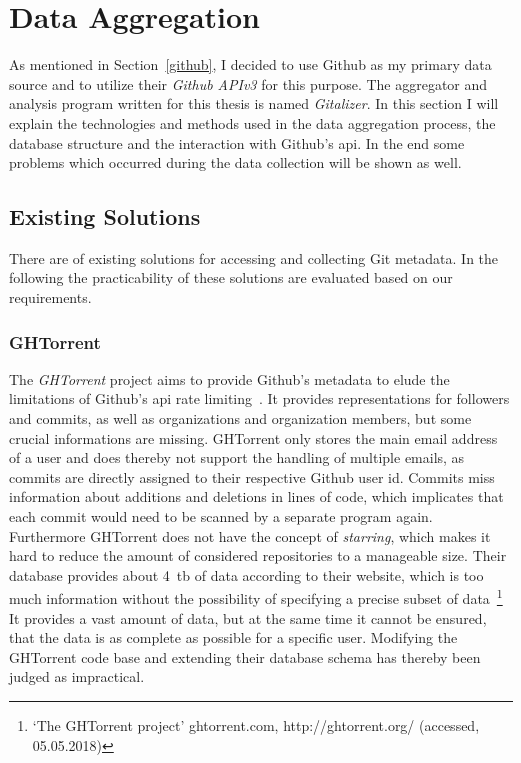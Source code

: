 \section{Data Aggregation}\label{aggregator}
As mentioned in Section~\ref{github}, I decided to use Github as my primary data source and to utilize their \emph{Github APIv3} for this purpose.
The aggregator and analysis program written for this thesis is named \emph{Gitalizer}.
In this section I will explain the technologies and methods used in the data aggregation process, the database structure and the interaction with Github's \ac{api}.
In the end some problems which occurred during the data collection will be shown as well.


\subsection{Existing Solutions}
There are of existing solutions for accessing and collecting Git metadata.
In the following the practicability of these solutions are evaluated based on our requirements.

\subsubsection{GHTorrent}
The \emph{GHTorrent} project aims to provide Github's metadata to elude the limitations of Github's \ac{api} rate limiting~\cite{inproceedings:ghtorrent}.
It provides representations for followers and commits, as well as organizations and organization members, but some crucial informations are missing.
GHTorrent only stores the main email address of a user and does thereby not support the handling of multiple emails, as commits are directly assigned to their respective Github user id.
Commits miss information about additions and deletions in lines of code, which implicates that each commit would need to be scanned by a separate program again.
Furthermore GHTorrent does not have the concept of \emph{starring}, which makes it hard to reduce the amount of considered repositories to a manageable size.
Their database provides about 4~\ac{tb} of data according to their website, which is too much information without the possibility of specifying a precise subset of data~\footnote{`The GHTorrent project' ghtorrent.com, http://ghtorrent.org/ (accessed, 05.05.2018)}
It provides a vast amount of data, but at the same time it cannot be ensured, that the data is as complete as possible for a specific user.
Modifying the GHTorrent code base and extending their database schema has thereby been judged as impractical.

